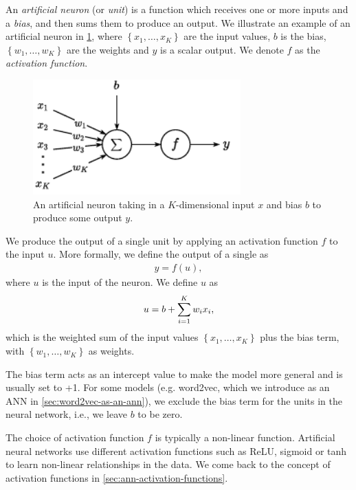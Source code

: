 An \textit{artificial neuron} (or \textit{unit}) is a function which receives one or more inputs and a \textit{bias}, and then sums them to produce an output. We illustrate an example of an artificial neuron in \cref{fig:artificial_neuron}, where $\left\{ x_1, \ldots, x_K \right\}$ are the input values, $b$ is the bias, $\left\{ w_1, \ldots, w_K \right\}$ are the weights and $y$ is a scalar output. We denote $f$ as the \textit{activation function}.
\begin{figure}[H]
    \centering
    \includegraphics[width=8cm]{thesis/figures/artificial-neuron_cropped.pdf}
    \caption{An artificial neuron taking in a $K$-dimensional input $x$ and bias $b$ to produce some output $y$.}
    \label{fig:artificial_neuron}
\end{figure}

We produce the output of a single unit by applying an activation function $f$ to the input $u$. More formally, we define the output of a single as
\begin{align}
    y = f(u),
\end{align}
where $u$ is the input of the neuron. We define $u$ as
\begin{align}
    u = b + \sum\limits_{i=1}^{K} w_i x_i,
\end{align}
which is the weighted sum of the input values $\left\{ x_1, \ldots, x_K \right\}$ plus the bias term, with $\left\{ w_1, \ldots, w_K \right\}$ as weights.

The bias term acts as an intercept value to make the model more general and is usually set to +1. For some models (e.g. word2vec, which we introduce as an ANN in \cref{sec:word2vec-as-an-ann}), we exclude the bias term for the units in the neural network, i.e., we leave $b$ to be zero.

The choice of activation function $f$ is typically a non-linear function. Artificial neural networks use different activation functions such as ReLU, sigmoid or tanh to learn non-linear relationships in the data. We come back to the concept of activation functions in \cref{sec:ann-activation-functions}.

